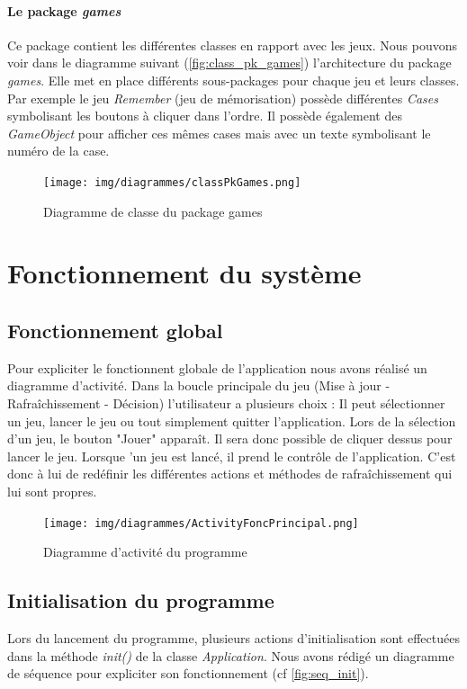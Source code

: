 \documentclass{polytech/polytech}
\begin{document}
\pagebreak
\paragraph{Le package \textit{games}}
Ce package contient les différentes classes en rapport avec les jeux. Nous pouvons voir dans le diagramme suivant (\autoref{fig:class_pk_games}) l'architecture du package \textit{games}. Elle met en place différents sous-packages pour chaque jeu et leurs classes.  Par exemple le jeu \textit{Remember} (jeu de mémorisation) possède différentes \textit{Cases} symbolisant les boutons à cliquer dans l'ordre. Il possède également des \textit{GameObject} pour afficher ces mêmes cases mais avec un texte symbolisant le numéro de la case.

\begin{figure}
    \centering
    \texttt{[image: img/diagrammes/classPkGames.png]}
    \caption{Diagramme de classe du package games}
    \label{fig:class_pk_games}
\end{figure}


\section{Fonctionnement du système}
\subsection{Fonctionnement global}
Pour expliciter le fonctionnent globale de l'application nous avons réalisé un diagramme d'activité. Dans la boucle principale du jeu (Mise à jour - Rafraîchissement - Décision) l'utilisateur a plusieurs choix : Il peut sélectionner un jeu, lancer le jeu ou tout simplement quitter l'application.
Lors de la sélection d'un jeu, le bouton "Jouer" apparaît. Il sera donc possible de cliquer dessus pour lancer le jeu. Lorsque 'un jeu est lancé, il prend le contrôle de l'application. C'est donc à lui de redéfinir les différentes actions et méthodes de rafraîchissement qui lui sont propres.
\begin{figure}
    \centering
    \texttt{[image: img/diagrammes/ActivityFoncPrincipal.png]}
    \caption{Diagramme d'activité du programme}
    \label{fig:activityDiag}
\end{figure}
\subsection{Initialisation du programme}
\label{sec:fonc_init}
Lors du lancement du programme, plusieurs actions d'initialisation sont effectuées dans la méthode \textit{init()} de la classe \textit{Application}. Nous avons rédigé un diagramme de séquence pour expliciter son fonctionnement (cf \autoref{fig:seq_init}). 
\end{document}

